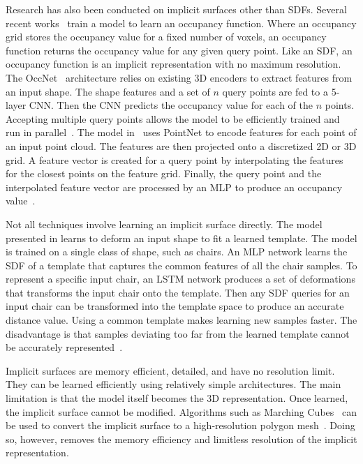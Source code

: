 Research has also been conducted on implicit surfaces other than SDFs. Several recent works~\cite{Mescheder2019, Peng2020} train a model to learn an occupancy function. Where an occupancy grid stores the occupancy value for a fixed number of voxels, an occupancy function returns the occupancy value for any given query point. Like an SDF, an occupancy function is an implicit representation with no maximum resolution. The OccNet~\cite{Mescheder2019} architecture relies on existing 3D encoders to extract features from an input shape. The shape features and a set of $n$ query points are fed to a 5-layer CNN. Then the CNN predicts the occupancy value for each of the $n$ points. Accepting multiple query points allows the model to be efficiently trained and run in parallel~\cite{Mescheder2019}. The model in~\cite{Peng2020} uses PointNet to encode features for each point of an input point cloud. The features are then projected onto a discretized 2D or 3D grid. A feature vector is created for a query point by interpolating the features for the closest points on the feature grid. Finally, the query point and the interpolated feature vector are processed by an MLP to produce an occupancy value~\cite{Peng2020}.

Not all techniques involve learning an implicit surface directly. The model presented in \cite{Zheng2021} learns to deform an input shape to fit a learned template. The model is trained on a single class of shape, such as chairs. An MLP network learns the SDF of a template that captures the common features of all the chair samples. To represent a specific input chair, an LSTM network produces a set of deformations that transforms the input chair onto the template. Then any SDF queries for an input chair can be transformed into the template space to produce an accurate distance value. Using a common template makes learning new samples faster. The disadvantage is that samples deviating too far from the learned template cannot be accurately represented~\cite{Zheng2021}.

Implicit surfaces are memory efficient, detailed, and have no resolution limit. They can be learned efficiently using relatively simple architectures. The main limitation is that the model itself becomes the 3D representation. Once learned, the implicit surface cannot be modified. Algorithms such as Marching Cubes~\cite{Lorensen1987} can be used to convert the implicit surface to a high-resolution polygon mesh~\cite{Xiao2020}. Doing so, however, removes the memory efficiency and limitless resolution of the implicit representation.

